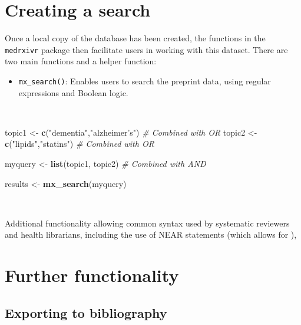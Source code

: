 \documentclass[a4paper, twoside]{templates/ociamthesis}
\providecommand{\tightlist}{%
  \setlength{\itemsep}{0pt}\setlength{\parskip}{0pt}}
\newenvironment{Shaded}{\begin{snugshade}}{\end{snugshade}}
\newcommand{\CommentTok}[1]{\textcolor[rgb]{0.56,0.35,0.01}{\textit{#1}}}
\newcommand{\KeywordTok}[1]{\textcolor[rgb]{0.13,0.29,0.53}{\textbf{#1}}}
\newcommand{\NormalTok}[1]{#1}
\newcommand{\StringTok}[1]{\textcolor[rgb]{0.31,0.60,0.02}{#1}}
\renewenvironment{Shaded}
{
  \vspace{4pt}%
  \begin{snugshade}%
}{%
  \end{snugshade}%
  \vspace{4pt}%
}
\begin{document}
\hypertarget{creating-a-search}{%
\section{Creating a search}\label{creating-a-search}}

Once a local copy of the database has been created, the functions in the \texttt{medrxivr} package then facilitate users in working with this dataset. There are two main functions and a helper function:

\begin{itemize}
\tightlist
\item
  \texttt{mx\_search()}: Enables users to search the preprint data, using regular expressions and Boolean logic.
\end{itemize}

~

\begin{Shaded}
\begin{Highlighting}[]
\NormalTok{topic1  <-}\StringTok{ }\KeywordTok{c}\NormalTok{(}\StringTok{"dementia"}\NormalTok{,}\StringTok{"alzheimer's"}\NormalTok{)  }\CommentTok{# Combined with OR}
\NormalTok{topic2  <-}\StringTok{ }\KeywordTok{c}\NormalTok{(}\StringTok{"lipids"}\NormalTok{,}\StringTok{"statins"}\NormalTok{)        }\CommentTok{# Combined with OR}

\NormalTok{myquery <-}\StringTok{ }\KeywordTok{list}\NormalTok{(topic1, topic2)         }\CommentTok{# Combined with AND}

\NormalTok{results <-}\StringTok{ }\KeywordTok{mx_search}\NormalTok{(myquery)}
\end{Highlighting}
\end{Shaded}

~

Additional functionality allowing common syntax used by systematic reviewers and health librarians, including the use of NEAR statements (which allows for ),

\hypertarget{further-functionality}{%
\section{Further functionality}\label{further-functionality}}

\hypertarget{exporting-to-bibliography}{%
\subsection{Exporting to bibliography}\label{exporting-to-bibliography}}
\end{document}
